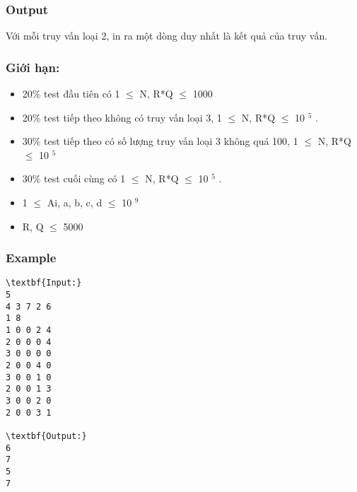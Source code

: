 \subsubsection{Output}

Với mỗi truy vấn loại 2, in ra một dòng duy nhất là kết quả của truy vấn.

\subsubsection{Giới hạn:}
\begin{itemize}
	\item 20\% test đầu tiên có 1  $\le$  N, R*Q  $\le$  1000
	\item 20\% test tiếp theo không có truy vấn loại 3, 1  $\le$  N, R*Q  $\le$  10 $^ 5 $ .
	\item 30\% test tiếp theo có số lượng truy vấn loại 3 không quá 100, 1  $\le$  N, R*Q  $\le$  10 $^ 5 $
	\item 30\% test cuối cùng có 1  $\le$  N, R*Q  $\le$  10 $^ 5 $ .
	\item 1  $\le$  Ai, a, b, c, d  $\le$  10 $^ 9 $
	\item R, Q  $\le$  5000
\end{itemize}

\subsubsection{Example}
\begin{verbatim}
\textbf{Input:}
5
4 3 7 2 6
1 8
1 0 0 2 4
2 0 0 0 4
3 0 0 0 0
2 0 0 4 0
3 0 0 1 0
2 0 0 1 3
3 0 0 2 0
2 0 0 3 1

\textbf{Output:}
6
7
5
7
\end{verbatim}
